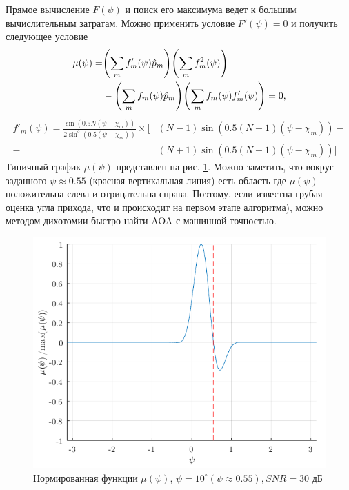 Прямое вычисление $F(\psi)$ и поиск его максимума ведет к большим вычислительным затратам. Можно применить условие $F'(\psi) =0$ и получить следующее условие
\begin{equation}
    \label{eq:4.31}
    \begin{aligned}
        \mu(\psi) = &
        \qty(\sum\limits_m f'_m(\psi) \hat p_m) \qty(\sum\limits_m f^2_m(\psi))                              \\
                    & - \qty(\sum\limits_m f_m(\psi)\hat p_m) \qty(\sum\limits_m f_m (\psi) f'_m(\psi)) = 0,
    \end{aligned}
\end{equation}
\begin{equation}
    \label{eq:4.32}
    \begin{aligned}
        f'_m(\psi) = \frac{\sin(0.5N (\psi - \chi_m))}{2\sin^3(0.5(\psi - \chi_m))} \times
        \big[
          & (N-1)\sin(0.5(N+1) (\psi - \chi_m)) - \\
        - & (N+1) \sin(0.5(N-1)(\psi - \chi_m))
            \big]
    \end{aligned}
\end{equation}
Типичный график $\mu(\psi)$ представлен на рис. \ref{fig:4.12}. Можно заметить, что вокруг заданного $\psi \approx 0.55$ (красная вертикальная линия) есть область где
$\mu(\psi)$ положительна слева и отрицательна справа. Поэтому, если известна грубая оценка угла прихода,
что и происходит на первом этапе алгоритма),
можно методом дихотомии быстро найти AOA с машинной точностью.
\begin{figure}[h!]
    \centering
    \includegraphics[width=0.5\linewidth]{figs/fig4.11}
    \caption{Нормированная функции $\mu(\psi)$, $\psi=10^{\circ} (\psi \approx 0.55), SNR=30$ дБ}
    \label{fig:4.12}
\end{figure}

